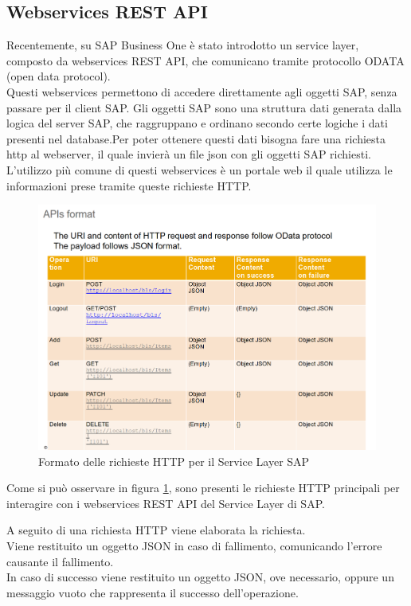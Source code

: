 \subsection{Webservices REST API}
\begin{flushleft}
	Recentemente, su SAP Business One è stato introdotto un service layer, composto da webservices REST API, che comunicano tramite protocollo ODATA (open data protocol).\\
	Questi webservices permettono di accedere direttamente agli oggetti SAP, senza passare per il client SAP. Gli oggetti SAP sono una struttura dati generata dalla logica del server SAP, che raggruppano e ordinano secondo certe logiche i dati presenti nel database.Per poter ottenere questi dati bisogna fare una richiesta http al webserver, il quale invierà un file json con gli oggetti SAP richiesti.\\L'utilizzo più comune di questi webservices è un portale web il quale utilizza le informazioni prese tramite queste richieste HTTP. 
\end{flushleft}
\begin{figure}[!h] 
	\centering 
	\includegraphics[scale = 0.37]{immagini/api_Format.png} 
	\caption {Formato delle richieste HTTP per il Service Layer SAP}
	\label{fig:2-11}
\end{figure}
\begin{flushleft}
	\item Come si può osservare in figura \ref{fig:2-11}, sono presenti le richieste HTTP principali per interagire con i webservices REST API del Service Layer di SAP.
	\item A seguito di una richiesta HTTP viene elaborata la richiesta.\\Viene restituito un oggetto JSON in caso di fallimento, comunicando l'errore causante il fallimento.\\In caso di successo viene restituito un oggetto JSON, ove necessario, oppure un messaggio vuoto che rappresenta il successo dell'operazione.
\end{flushleft}
